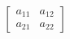 \documentclass{article}
\begin{document}
\begin{huge}

\[ \left[ \begin{matrix}
a_{11} & a_{12} \\ 
a_{21} & a_{22}
\end{matrix} \right] \]


\end{huge}
\end{document}
